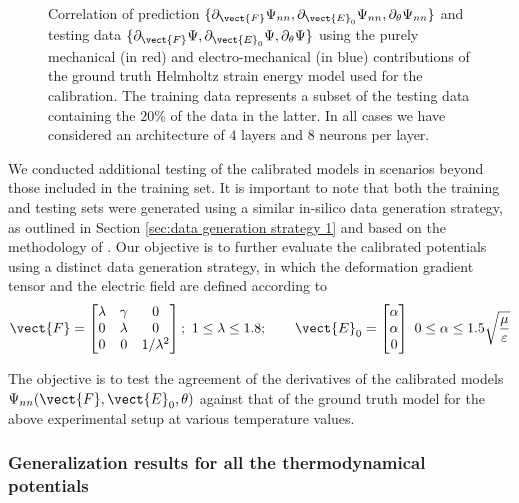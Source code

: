 \begin{figure}[hbtp!]
\begin{tabular}{cccc}
%
%
	\end{tabular}
	\caption{Correlation of prediction $\{\partial_{\vect{F}}\Psi_{nn},\partial_{\vect{E}_0}\Psi_{nn},\partial_{\theta}\Psi_{nn}\}$ and testing data $\{\partial_{\vect{F}}\Psi,\partial_{\vect{E}_0}\Psi,\partial_{\theta}\Psi\}$ using the purely mechanical (in red) and electro-mechanical (in blue) contributions of the ground truth Helmholtz strain energy model used for the calibration. The training data represents a subset of the testing data containing the $20\%$ of the data in the latter. In all cases we have considered an architecture of $4$ layers and $8$ neurons per layer.}
	\label{fig:correlation strategy 1}
\end{figure}

We conducted additional testing of the calibrated models in scenarios beyond those included in the training set. It is important to note that both the training and testing sets were generated using a similar in-silico data generation strategy, as outlined in Section \ref{sec:data generation strategy 1} and based on the methodology of \cite{OKunc_19_01}. Our objective is to further evaluate the calibrated potentials using a distinct data generation strategy, in which the deformation gradient tensor and the electric field are defined according to
%
\begin{equation}
	\vect{F}=\begin{bmatrix}
		\lambda & \gamma & 0\\
		0&\lambda & 0\\
		0  &  0 & 1/\lambda^2
	\end{bmatrix};\,\,1\leq \lambda \leq 1.8; \qquad \vect{E}_0 =  \begin{bmatrix}
	\alpha  \\  \alpha  \\  0
\end{bmatrix}\,\,0\leq \alpha\leq 1.5\sqrt{\frac{\mu}{\varepsilon}}
\end{equation}

The objective is to test the agreement of the derivatives of the calibrated models $\Psi_{nn}(\vect{F},\vect{E}_0,\theta)$ against that of the ground truth model for the above experimental setup at various temperature values. 

\clearpage

\subsubsection{Generalization results for all the thermodynamical potentials}

